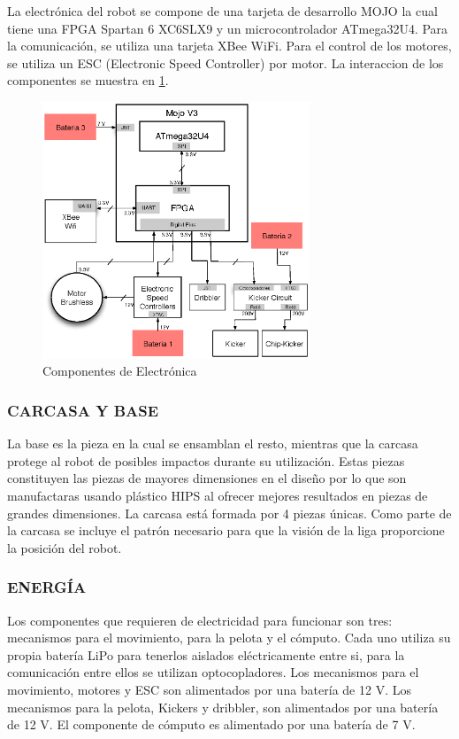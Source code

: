 \documentclass[twocolumn,10pt]{amrob}
\begin{document}
La electrónica del robot se compone de una tarjeta de desarrollo MOJO la cual tiene una FPGA Spartan 6 XC6SLX9 y un microcontrolador ATmega32U4. Para la comunicaci\'on, se utiliza una tarjeta XBee WiFi. Para el control de los motores, se utiliza un ESC (Electronic Speed Controller) por motor. La interaccion de los componentes se muestra en \ref{fig:electGral}. \par
\begin{figure}
  \centering
    \includegraphics[width=8cm]{diagElectronica.eps}
  \caption{Componentes de Electrónica}
  \label{fig:electGral}
\end{figure}
\subsubsection*{CARCASA Y BASE}
La base es la pieza en la cual se ensamblan el resto, mientras que la carcasa protege al robot de posibles impactos durante su utilización. Estas piezas constituyen las piezas de mayores dimensiones en el dise\~no por lo que son manufactaras usando plástico HIPS al ofrecer mejores resultados en piezas de grandes dimensiones. La carcasa est\'a formada por 4 piezas \'unicas. Como parte de la carcasa se incluye el patrón necesario para que la visi\'on de la liga proporcione la posici\'on del robot.\par
\subsubsection*{ENERGÍA}
Los componentes que requieren de electricidad para funcionar son tres: mecanismos para el movimiento, para la pelota y el cómputo. Cada uno utiliza su propia batería LiPo para tenerlos aislados eléctricamente entre si, para la comunicación entre ellos se utilizan optocopladores. Los mecanismos para el movimiento, motores y ESC son alimentados por una batería de 12 V. Los mecanismos para la pelota, Kickers y dribbler, son alimentados por una batería de 12 V. El componente de cómputo es alimentado por una batería de 7 V.
\end{document}
